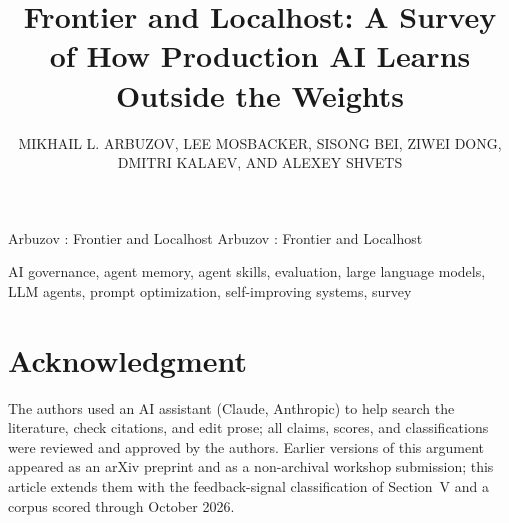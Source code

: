 \documentclass{ieeeaccess}
\begin{document}

\title{Frontier and Localhost: A Survey of How Production AI Learns Outside the Weights}

\author{\uppercase{Mikhail L. Arbuzov},
\uppercase{Lee Mosbacker},
\uppercase{Sisong Bei},
\uppercase{Ziwei Dong},
\uppercase{Dmitri Kalaev},
AND \uppercase{Alexey Shvets}}

\address[1]{Independent Researcher, CITY, COUNTRY (e-mail: mike.arbuzov54@gmail.com)}
\address[2]{Independent Researcher, CITY, COUNTRY (e-mail: lee.mosbacker@gmail.com)}
\address[3]{Independent Researcher, CITY, COUNTRY (e-mail: qurining@gmail.com)}
\address[4]{Independent Researcher, CITY, COUNTRY (e-mail: ziwei.dong@alumni.emory.edu)}
\address[5]{Independent Researcher, CITY, COUNTRY (e-mail: kalaevdr@gmail.com)}
\address[6]{Palo Alto Networks, CITY, COUNTRY (e-mail: ashvets@paloaltonetworks.com)}

\markboth
{Arbuzov \headeretal: Frontier and Localhost}
{Arbuzov \headeretal: Frontier and Localhost}


\begin{abstract}

\end{abstract}

\begin{keywords}
AI governance, agent memory, agent skills, evaluation, large language models, LLM agents, prompt optimization, self-improving systems, survey
\end{keywords}

\titlepgskip=-21pt

\maketitle



\section*{Acknowledgment}
The authors used an AI assistant (Claude, Anthropic) to help search the literature, check citations, and edit prose; all claims, scores, and classifications were reviewed and approved by the authors. Earlier versions of this argument appeared as an arXiv preprint and as a non-archival workshop submission; this article extends them with the feedback-signal classification of Section~V and a corpus scored through October 2026.
\end{document}
